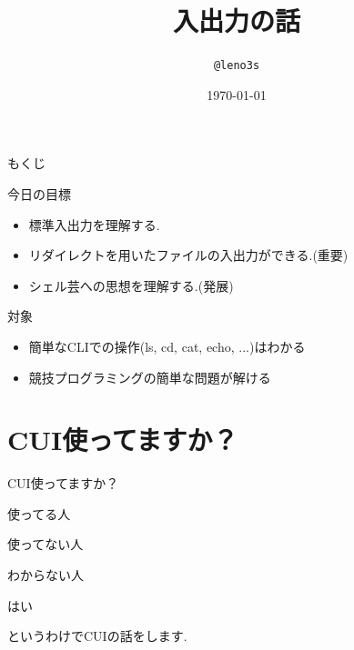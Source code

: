 \documentclass[uplatex, dvipdfmx, unicode]{beamer}
\title{入出力の話}
\author{\texttt{@leno3s}}
\date{\today}
\institute{\url{leno3s.net}}
\begin{document}
\maketitle

\begin{frame}{もくじ}
  \tableofcontents
\end{frame}

\begin{frame}{今日の目標}
  \begin{itemize}
    \item{標準入出力を理解する.}
    \item{リダイレクトを用いたファイルの入出力ができる.(重要)}
    \item{シェル芸への思想を理解する.(発展)}
  \end{itemize}
  

\end{frame}

\begin{frame}{対象}
  \begin{itemize}
    \item{簡単なCLIでの操作(ls, cd, cat, echo, ...)はわかる}
    \item{競技プログラミングの簡単な問題が解ける}
  \end{itemize}

\end{frame}

\section{CUI使ってますか？}
\begin{frame}
  \centering
  \Huge{CUI使ってますか？}
\end{frame}

\begin{frame}
  \centering
  \Huge{使ってる人\faHandPaperO}
\end{frame}

\begin{frame}
  \centering
  \Huge{使ってない人\faHandPaperO}
\end{frame}

\begin{frame}
  \centering
  \Huge{わからない人\faHandPaperO}
\end{frame}

\begin{frame}
  \centering
  \Huge{はい}
\end{frame}

\begin{frame}
  というわけでCUIの話をします.
\end{frame}
\end{document}
